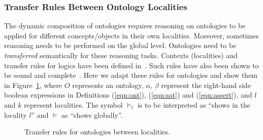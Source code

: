 \documentclass[preprint,12pt]{elsarticle}
\begin{document}
\subsubsection{Transfer Rules Between Ontology Localities}
The dynamic composition of ontologies requires reasoning on ontologies to be applied for different concepts/objects in their own localities. Moreover, sometimes reasoning needs to be performed on the global level. Ontologies need to be \emph{transferred} semantically for these reasoning tasks. Contexts (localities) and transfer rules for logics have been defined in~\cite{springerlink:10.1007/978-3-642-11819-7_15,buvac95}. Such rules have also been shown to be sound and complete~\cite{buvac95}. Here we adapt these rules for ontologies and show them in Figure~\ref{fig:rules}, where $O$ represents an ontology, $\alpha$, $\beta$ represent the right-hand side boolean expressions in Definitions (\ref{eqn:ont}), (\ref{eqn:sat}) and (\ref{eqn:assert}), and $l$ and $k$ represent localities. The symbol $\models_l$ is to be interpreted as ``shows in the locality $l$'' and $\models$ as ``shows globally''.

\setlength\fboxsep{1pt}
\setlength\fboxrule{0.5pt}
\begin{figure}[htb]
\centering\small
{}
\caption{Transfer rules for ontologies between localities.}\label{fig:rules}
\end{figure}
\end{document}
